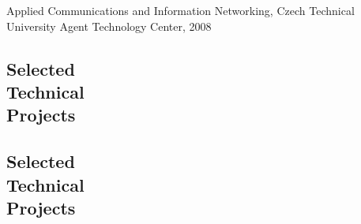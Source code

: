 \documentclass[margin]{res}
\begin{document}
\begin{resume}
\begin{educate}
\begin{list}{}{\leftmargin=1em}
\item Applied Communications and Information Networking, Czech Technical University Agent Technology Center, 2008 
\end{list}
\end{educate}

\begin{tech}
\section{Selected \\ Technical \\ Projects}
\end{tech}
\begin{general}
\section{Selected \\ Technical \\ Projects}
\end{general}


\end{resume}
\end{document}
